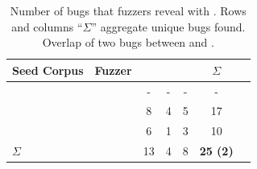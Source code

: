 \begin{table}[t]
    \caption{Number of bugs that fuzzers reveal with \rtbench{}. Rows and columns ``$\Sigma$'' aggregate unique bugs found. Overlap of two bugs between \wasmaker{} and \wapplique{}. 
    }
    \label{tab:rt_fuzz_bugs}
    \footnotesize
    \centering
    \setlength{\tabcolsep}{2.8pt}
    \begin{tabular}{llccccr}
        \toprule
        \textbf{Seed Corpus} & \textbf{Fuzzer} & \textbf{\wasmer{}} & \textbf{\wamr{}} & \textbf{\wasmedge{}} & \textbf{$\Sigma$} \\ 
        \midrule
        \multirow{3}{*}{\rtbench{}} 
            & \wadiff{}    & - & - & - & - \\
            & \wasmaker{}  & 8 & 4 & 5 & 17 \\
            & \wapplique{} & 6 & 1 & 3 & 10 \\  
        \midrule
        $\Sigma$ & & 13 & 4 & 8 & \textbf{25 (2)}\\
        \bottomrule
    \end{tabular}
\end{table}